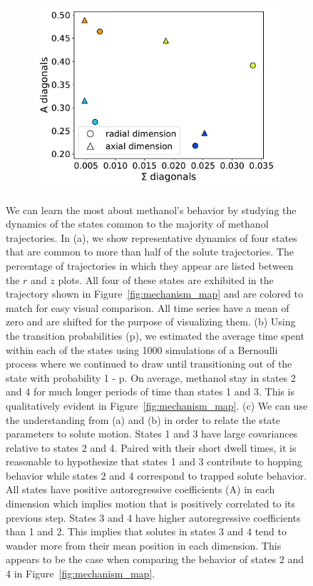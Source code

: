 \documentclass{article}
\begin{document}
\begin{figure}
\begin{subfigure}{0.35\textwidth}
  \caption{}\label{fig:dwell_times_MET}
  \includegraphics[width=\textwidth]{A_sigma_scatter_MET.pdf}
  \caption{}\label{fig:A_sigma_scatter_MET}
  \end{subfigure}
  \caption{We can learn the most about methanol's behavior by studying the dynamics
  of the states common to the majority of methanol trajectories. In (a), we show representative
  dynamics of four states that are common to more than half of the solute trajectories. The
  percentage of trajectories in which they appear are listed between the $r$ and $z$ plots. 
  All four of these states are exhibited in the trajectory shown in Figure~\ref{fig:mechanism_map}
  and are colored to match for easy visual comparison. All time series have a mean of zero and are
  shifted for the purpose of visualizing them. (b) Using the transition probabilities (p), 
  we estimated the average time spent within each of the states using 1000 simulations of a Bernoulli 
  process where we continued to draw until transitioning out of the state with probability 1 - p.
  On average, methanol stay in states 2 and 4 for much longer periods of time than states 1 and 3.
  This is qualitatively evident in Figure~\ref{fig:mechanism_map}. (c) We can use the understanding
  from (a) and (b) in order to relate the state parameters to solute motion. States 1 and 3 have
  large covariances relative to states 2 and 4. Paired with their short dwell times, it is reasonable
  to hypothesize that states 1 and 3 contribute to hopping behavior while states 2 and 4 
  correspond to trapped solute behavior. All states have positive autoregressive coefficients (A) in 
  each dimension which implies motion that is positively correlated to its previous step. States 3 and
  4 have higher autoregressive coefficients than 1 and 2. This implies that solutes in states 3 and 
  4 tend to wander more from their mean position in each dimension. This appears to be the case when
  comparing the behavior of states 2 and 4 in Figure~\ref{fig:mechanism_map}.}\label{fig:common_states_MET}
  \end{figure}
  
\end{document}
